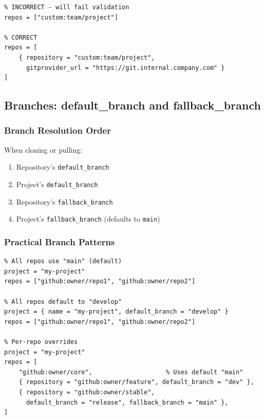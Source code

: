 \begin{lstlisting}
% INCORRECT - will fail validation
repos = ["custom:team/project"]

% CORRECT
repos = [
    { repository = "custom:team/project", 
      gitprovider_url = "https://git.internal.company.com" }
]
\end{lstlisting}

\subsection{Branches: default\_branch and fallback\_branch}
\label{subsec:cgs-branches}

\subsubsection{Branch Resolution Order}

When cloning or pulling:

\begin{enumerate}
  \item Repository's \texttt{default\_branch}
  \item Project's \texttt{default\_branch}
  \item Repository's \texttt{fallback\_branch}
  \item Project's \texttt{fallback\_branch} (defaults to \texttt{main})
\end{enumerate}

\subsubsection{Practical Branch Patterns}

\begin{lstlisting}
% All repos use "main" (default)
project = "my-project"
repos = ["github:owner/repo1", "github:owner/repo2"]

% All repos default to "develop"
project = { name = "my-project", default_branch = "develop" }
repos = ["github:owner/repo1", "github:owner/repo2"]

% Per-repo overrides
project = "my-project"
repos = [
    "github:owner/core",                    % Uses default "main"
    { repository = "github:owner/feature", default_branch = "dev" },
    { repository = "github:owner/stable", 
      default_branch = "release", fallback_branch = "main" },
]
\end{lstlisting}

